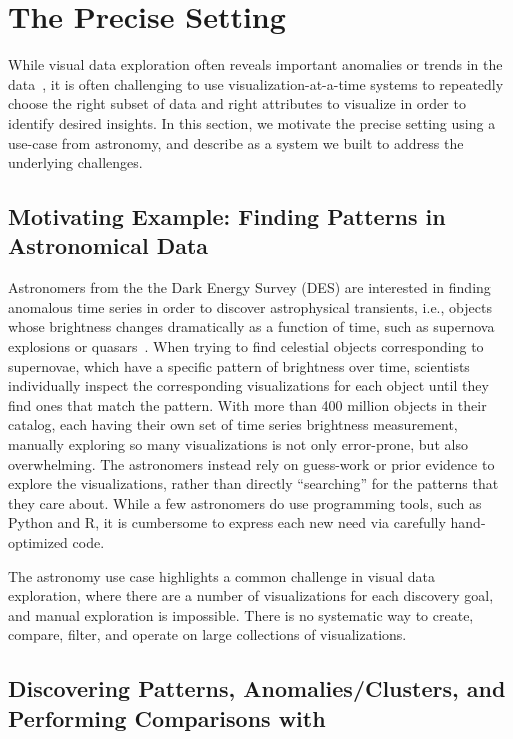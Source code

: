 
\section{The Precise Setting}\label{sec:precise}
While visual data exploration often reveals 
important anomalies or trends 
in the data~\cite{Heer2012,Morton2014}, 
it is often challenging to 
use visualization-at-a-time systems to 
repeatedly choose the right subset of 
data and right attributes to visualize
in order to identify desired insights.
In this section, we motivate
the precise setting using a use-case from
astronomy, and describe \zv as a system
we built to address the underlying challenges.

\subsection{Motivating Example: Finding Patterns in Astronomical Data}
Astronomers from the the Dark Energy Survey (DES) 
are interested in finding 
anomalous time series 
in order to discover 
astrophysical transients, 
i.e., objects whose brightness 
changes dramatically as a function of time, 
such as supernova explosions or quasars~\cite{Drlica-Wagner2017}. 
When trying to find celestial objects 
corresponding to supernovae, 
which have a specific pattern of brightness over time, 
scientists individually inspect the corresponding 
visualizations for each object until 
they find ones that match the pattern. 
With more than 400 million objects in their catalog, 
each having their own set of time series brightness measurement, 
manually exploring so many 
visualizations is not only error-prone, 
but also overwhelming.
The astronomers instead rely on guess-work 
or prior evidence to explore the visualizations,
rather than directly ``searching'' for the patterns
that they care about. 
While a few astronomers do use 
programming tools, such as Python and R,
it is cumbersome to express each new need
via carefully hand-optimized code. 

The astronomy use case highlights a 
common challenge in visual data exploration,
where there are a number of visualizations
for each discovery goal,
and manual exploration is impossible.
There is no systematic way to create, compare, filter,
and operate on large collections of visualizations.

\subsection{Discovering Patterns, Anomalies/Clusters, and Performing Comparisons with \zv}


